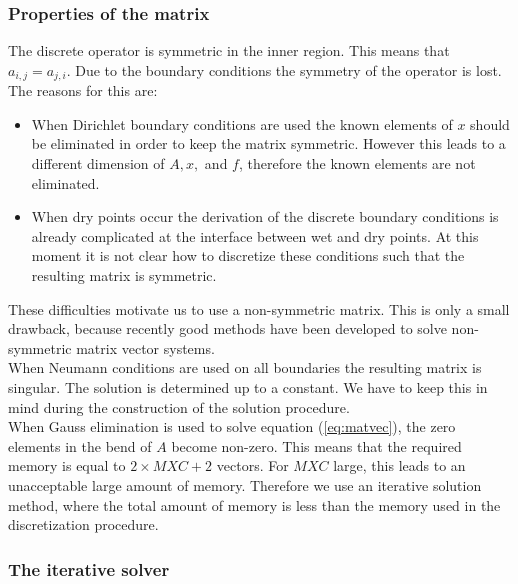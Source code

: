 \documentclass[12pt]{book}
\begin{document}
\subsubsection{Properties of the matrix}
\label{sec:prop}
The discrete operator is symmetric in the inner region. This means that
$a_{i,j} = a_{j,i}$. Due to the boundary conditions the symmetry of the
operator is lost. The reasons for this are:
\begin{itemize}
\item When Dirichlet boundary conditions are used the known elements of
$x$
should be eliminated in order to keep the matrix symmetric. However this
leads to a different dimension of $A, x,$ and $f$, therefore the known
elements are not eliminated.
\item When dry points occur the derivation of the discrete boundary
conditions is already complicated at the interface between wet and dry
points. At this moment it is not clear how to discretize these
conditions such that the resulting matrix is symmetric.
\end{itemize}
These difficulties motivate us to use a non-symmetric matrix. This is
only a small drawback, because recently good methods have
been developed to
solve non-symmetric matrix vector systems.\\[2ex]
When Neumann conditions are used on all boundaries the resulting matrix
is singular. The solution is determined up to a constant. We have to
keep this in mind during the construction of the solution
procedure.\\[2ex]
When Gauss elimination is used to solve equation (\ref{eq:matvec}), the
zero elements in the bend of $A$ become non-zero. This means that the
required memory is equal to $2 \times MXC  + 2$ vectors.
For $MXC$ large, this leads to an unacceptable large amount of memory.
Therefore we use an iterative solution method, where the total amount of
memory is less than the memory used in the discretization procedure.
\subsubsection{The iterative solver} \label{sec:iter}
\end{document}
